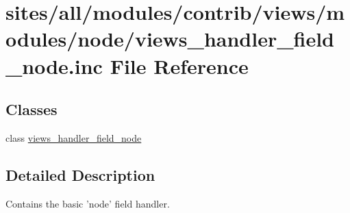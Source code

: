 \hypertarget{views__handler__field__node_8inc}{
\section{sites/all/modules/contrib/views/modules/node/views\_\-handler\_\-field\_\-node.inc File Reference}
\label{views__handler__field__node_8inc}
}
\subsection*{Classes}
\begin{CompactItemize}
\item 
class \hyperlink{classviews__handler__field__node}{views\_\-handler\_\-field\_\-node}
\end{CompactItemize}


\subsection{Detailed Description}
Contains the basic 'node' field handler. 